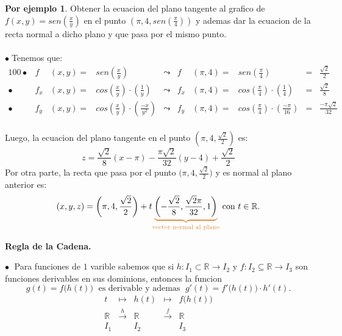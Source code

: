 \documentclass{article}
\theoremstyle{definition}
\newtheorem*{ej}{Por ejemplo}
\theoremstyle{remark}
\newcommand\bl{$\bullet\;$}
\begin{document}
\begin{ej}
  Obtener la ecuacion del plano tangente al grafico de \mbox{$f(x,y)=sen\left(\frac{x}{y}\right)$} en el punto $\left(\pi, 4, sen\left(\frac{\pi}{4}\right)\right)$ y ademas dar la ecuacion de la recta normal a dicho plano y que pasa por el mismo punto.\\\\
  \bl Tenemos que: \begin{alignat*}{100}
    \bullet & f & (x,y)=&sen\left(\frac{x}{y}\right) &\leadsto & f & (\pi,4) = & sen\left(\frac{\pi}{4}\right) & = & \frac{\sqrt{2}}{2} \\
    \bullet & f_x & (x,y)=&cos\left(\frac{x}{y}\right)\cdot \left(\frac{1}{y}\right) &\leadsto & f_x & (\pi,4) = & cos\left(\frac{\pi}{4}\right) \cdot \left(\frac{1}{4}\right) &= & \frac{\sqrt{2}}{8} \\
    \bullet & f_y & (x,y)=&cos\left(\frac{x}{y}\right)\cdot \left(\frac{-x}{y^2}\right) &\leadsto & f_y & (\pi,4) = & cos\left(\frac{\pi}{4}\right) \cdot \left(\frac{-\pi}{16}\right)&  = & \frac{-\pi\sqrt{2}}{32} 
    \end{alignat*} \\ Luego, la ecuacion del plano tangente en el punto $\left(\pi,4,\frac{\sqrt{2}}{2}\right)$ es: \[ 
    z=\frac{\sqrt{2}}{8}(x - \pi)-\frac{\pi\sqrt{2}}{32}(y-4)+\frac{\sqrt{2}}{2}
  \] Por otra parte, la recta que pasa por el punto $\big(\pi,4,\frac{\sqrt{2}}{2}\big)$ y es normal al plano anterior es: \[
  (x,y,z)=\left(\pi,4,\frac{\sqrt{2}}{2}\right)+t\textcolor{rojop2}{\underbrace{\textcolor{black}{\left(-\frac{\sqrt{2}}{8},\frac{\sqrt{2}\pi}{32},1\right)}}_{\text{vector normal al plano}}} \text{ con } t \in \mathbb{R}
  .\]
\end{ej}
\pagebreak
\begin{center}
\textbf{Regla de la Cadena.}
\end{center}
\textcolor{rojop2}{\bl} Para funciones de $1$ varible sabemos que si $h : I_1 \subset \mathbb{R} \to I_2 $ y $ f: I_2 \subseteq \mathbb{R} \to I_3$ son funciones derivables en sus dominions, entonces la funcion \[
  g(t)=f\big(h(t)\big) \; \text{ es derivable y ademas }\; g'(t) = f'\big(h(t)\big)\cdot h'(t).
  \]
  $$\begin{array}{lcccc}
  t & \mapsto & h(t) & \mapsto & f\big(h(t)\big) \\
  \mathbb{R} & \xrightarrow{h} & \mathbb{R} & \xrightarrow{f} & \mathbb{R} \\
  I_1 & & I_2 & & I_3
\end{array}$$
\end{document}
